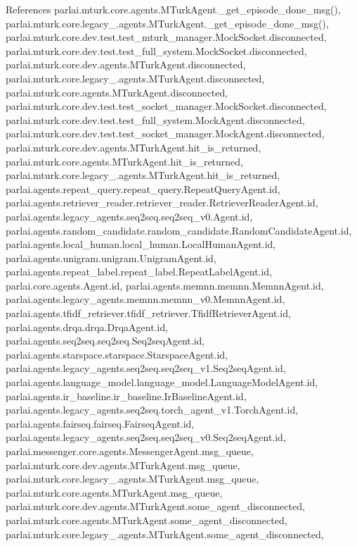 References parlai.\+mturk.\+core.\+agents.\+M\+Turk\+Agent.\+\_\+get\+\_\+episode\+\_\+done\+\_\+msg(), parlai.\+mturk.\+core.\+legacy\+\_.\+agents.\+M\+Turk\+Agent.\+\_\+get\+\_\+episode\+\_\+done\+\_\+msg(), parlai.\+mturk.\+core.\+dev.\+test.\+test\+\_\+mturk\+\_\+manager.\+Mock\+Socket.\+disconnected, parlai.\+mturk.\+core.\+dev.\+test.\+test\+\_\+full\+\_\+system.\+Mock\+Socket.\+disconnected, parlai.\+mturk.\+core.\+dev.\+agents.\+M\+Turk\+Agent.\+disconnected, parlai.\+mturk.\+core.\+legacy\+\_.\+agents.\+M\+Turk\+Agent.\+disconnected, parlai.\+mturk.\+core.\+agents.\+M\+Turk\+Agent.\+disconnected, parlai.\+mturk.\+core.\+dev.\+test.\+test\+\_\+socket\+\_\+manager.\+Mock\+Socket.\+disconnected, parlai.\+mturk.\+core.\+dev.\+test.\+test\+\_\+full\+\_\+system.\+Mock\+Agent.\+disconnected, parlai.\+mturk.\+core.\+dev.\+test.\+test\+\_\+socket\+\_\+manager.\+Mock\+Agent.\+disconnected, parlai.\+mturk.\+core.\+dev.\+agents.\+M\+Turk\+Agent.\+hit\+\_\+is\+\_\+returned, parlai.\+mturk.\+core.\+agents.\+M\+Turk\+Agent.\+hit\+\_\+is\+\_\+returned, parlai.\+mturk.\+core.\+legacy\+\_.\+agents.\+M\+Turk\+Agent.\+hit\+\_\+is\+\_\+returned, parlai.\+agents.\+repeat\+\_\+query.\+repeat\+\_\+query.\+Repeat\+Query\+Agent.\+id, parlai.\+agents.\+retriever\+\_\+reader.\+retriever\+\_\+reader.\+Retriever\+Reader\+Agent.\+id, parlai.\+agents.\+legacy\+\_\+agents.\+seq2seq.\+seq2seq\+\_\+v0.\+Agent.\+id, parlai.\+agents.\+random\+\_\+candidate.\+random\+\_\+candidate.\+Random\+Candidate\+Agent.\+id, parlai.\+agents.\+local\+\_\+human.\+local\+\_\+human.\+Local\+Human\+Agent.\+id, parlai.\+agents.\+unigram.\+unigram.\+Unigram\+Agent.\+id, parlai.\+agents.\+repeat\+\_\+label.\+repeat\+\_\+label.\+Repeat\+Label\+Agent.\+id, parlai.\+core.\+agents.\+Agent.\+id, parlai.\+agents.\+memnn.\+memnn.\+Memnn\+Agent.\+id, parlai.\+agents.\+legacy\+\_\+agents.\+memnn.\+memnn\+\_\+v0.\+Memnn\+Agent.\+id, parlai.\+agents.\+tfidf\+\_\+retriever.\+tfidf\+\_\+retriever.\+Tfidf\+Retriever\+Agent.\+id, parlai.\+agents.\+drqa.\+drqa.\+Drqa\+Agent.\+id, parlai.\+agents.\+seq2seq.\+seq2seq.\+Seq2seq\+Agent.\+id, parlai.\+agents.\+starspace.\+starspace.\+Starspace\+Agent.\+id, parlai.\+agents.\+legacy\+\_\+agents.\+seq2seq.\+seq2seq\+\_\+v1.\+Seq2seq\+Agent.\+id, parlai.\+agents.\+language\+\_\+model.\+language\+\_\+model.\+Language\+Model\+Agent.\+id, parlai.\+agents.\+ir\+\_\+baseline.\+ir\+\_\+baseline.\+Ir\+Baseline\+Agent.\+id, parlai.\+agents.\+legacy\+\_\+agents.\+seq2seq.\+torch\+\_\+agent\+\_\+v1.\+Torch\+Agent.\+id, parlai.\+agents.\+fairseq.\+fairseq.\+Fairseq\+Agent.\+id, parlai.\+agents.\+legacy\+\_\+agents.\+seq2seq.\+seq2seq\+\_\+v0.\+Seq2seq\+Agent.\+id, parlai.\+messenger.\+core.\+agents.\+Messenger\+Agent.\+msg\+\_\+queue, parlai.\+mturk.\+core.\+dev.\+agents.\+M\+Turk\+Agent.\+msg\+\_\+queue, parlai.\+mturk.\+core.\+legacy\+\_.\+agents.\+M\+Turk\+Agent.\+msg\+\_\+queue, parlai.\+mturk.\+core.\+agents.\+M\+Turk\+Agent.\+msg\+\_\+queue, parlai.\+mturk.\+core.\+dev.\+agents.\+M\+Turk\+Agent.\+some\+\_\+agent\+\_\+disconnected, parlai.\+mturk.\+core.\+agents.\+M\+Turk\+Agent.\+some\+\_\+agent\+\_\+disconnected, parlai.\+mturk.\+core.\+legacy\+\_.\+agents.\+M\+Turk\+Agent.\+some\+\_\+agent\+\_\+disconnected, 